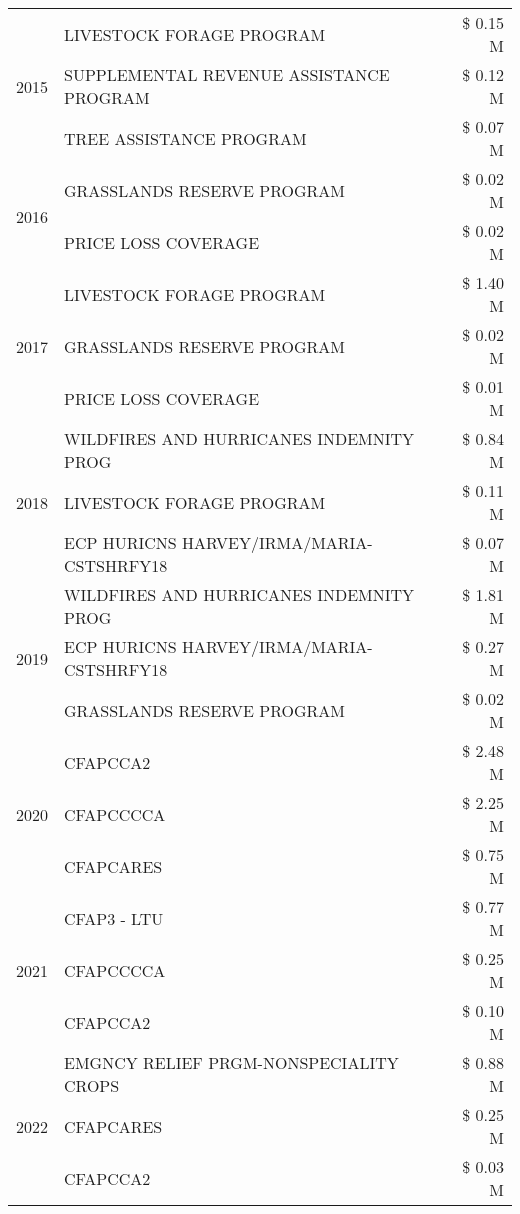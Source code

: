 \begin{tabular}{llr}
\cline{1-3}
\multirow[t]{3}{*}{2015} & LIVESTOCK FORAGE PROGRAM & \$ 0.15 M \\
 & SUPPLEMENTAL REVENUE ASSISTANCE PROGRAM & \$ 0.12 M \\
 & TREE ASSISTANCE PROGRAM & \$ 0.07 M \\
\cline{1-3}
\multirow[t]{2}{*}{2016} & GRASSLANDS RESERVE PROGRAM & \$ 0.02 M \\
 & PRICE LOSS COVERAGE & \$ 0.02 M \\
\cline{1-3}
\multirow[t]{3}{*}{2017} & LIVESTOCK FORAGE PROGRAM & \$ 1.40 M \\
 & GRASSLANDS RESERVE PROGRAM & \$ 0.02 M \\
 & PRICE LOSS COVERAGE & \$ 0.01 M \\
\cline{1-3}
\multirow[t]{3}{*}{2018} & WILDFIRES AND HURRICANES INDEMNITY PROG & \$ 0.84 M \\
 & LIVESTOCK FORAGE PROGRAM & \$ 0.11 M \\
 & ECP HURICNS HARVEY/IRMA/MARIA-CSTSHRFY18 & \$ 0.07 M \\
\cline{1-3}
\multirow[t]{3}{*}{2019} & WILDFIRES AND HURRICANES INDEMNITY PROG & \$ 1.81 M \\
 & ECP HURICNS HARVEY/IRMA/MARIA-CSTSHRFY18 & \$ 0.27 M \\
 & GRASSLANDS RESERVE PROGRAM & \$ 0.02 M \\
\cline{1-3}
\multirow[t]{3}{*}{2020} & CFAPCCA2 & \$ 2.48 M \\
 & CFAPCCCCA & \$ 2.25 M \\
 & CFAPCARES & \$ 0.75 M \\
\cline{1-3}
\multirow[t]{3}{*}{2021} & CFAP3 - LTU & \$ 0.77 M \\
 & CFAPCCCCA & \$ 0.25 M \\
 & CFAPCCA2 & \$ 0.10 M \\
\cline{1-3}
\multirow[t]{3}{*}{2022} & EMGNCY RELIEF PRGM-NONSPECIALITY CROPS & \$ 0.88 M \\
 & CFAPCARES & \$ 0.25 M \\
 & CFAPCCA2 & \$ 0.03 M \\
\cline{1-3}
\bottomrule
\end{tabular}
